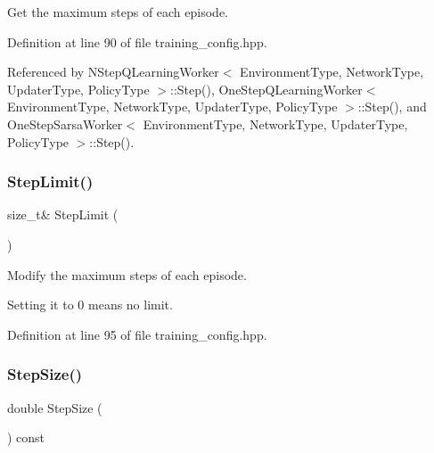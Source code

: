 Get the maximum steps of each episode. 



Definition at line 90 of file training\+\_\+config.\+hpp.



Referenced by N\+Step\+Q\+Learning\+Worker$<$ Environment\+Type, Network\+Type, Updater\+Type, Policy\+Type $>$\+::\+Step(), One\+Step\+Q\+Learning\+Worker$<$ Environment\+Type, Network\+Type, Updater\+Type, Policy\+Type $>$\+::\+Step(), and One\+Step\+Sarsa\+Worker$<$ Environment\+Type, Network\+Type, Updater\+Type, Policy\+Type $>$\+::\+Step().

\mbox{\label{classmlpack_1_1rl_1_1TrainingConfig_a8affdbc5f4db5e3f62e0e56a1e7de599}} 
\subsubsection{Step\+Limit()\hspace{0.1cm}{\footnotesize\ttfamily [2/2]}}
{\footnotesize\ttfamily size\+\_\+t\& Step\+Limit (\begin{DoxyParamCaption}{ }\end{DoxyParamCaption})\hspace{0.3cm}{\ttfamily [inline]}}



Modify the maximum steps of each episode. 

Setting it to 0 means no limit. 

Definition at line 95 of file training\+\_\+config.\+hpp.

\mbox{\label{classmlpack_1_1rl_1_1TrainingConfig_a11e6eb66d82a14ebd2943b49db676444}} 
\subsubsection{Step\+Size()\hspace{0.1cm}{\footnotesize\ttfamily [1/2]}}
{\footnotesize\ttfamily double Step\+Size (\begin{DoxyParamCaption}{ }\end{DoxyParamCaption}) const\hspace{0.3cm}{\ttfamily [inline]}}



